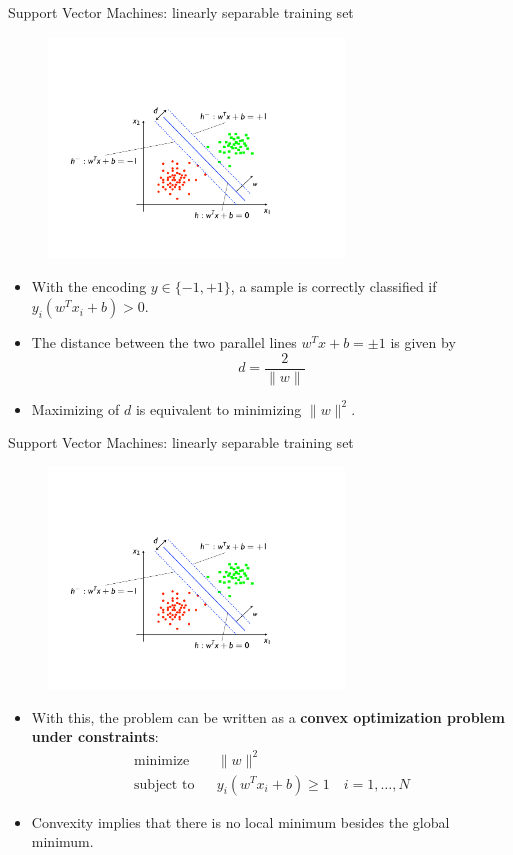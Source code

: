 \documentclass[xcolor=pdftex,dvipsnames,table]{beamer}
\begin{document}
\begin{frame}{Support Vector Machines: linearly separable training set}
	\begin{figure}[htb]
		\includegraphics[width=0.7\textwidth]{../graphics/SVM2.pdf}
	\end{figure}
	\begin{itemize}
		\item With the encoding $y\in\{-1,+1\}$, a sample is correctly classified if $y_i(w^Tx_i + b) > 0$. 
		\item The distance between the two parallel lines $w^Tx + b = \pm 1$ is given by
		\begin{equation}
			d = \frac{2}{\|w\|}
		\end{equation}
		\item Maximizing of $d$ is equivalent to minimizing $\|w\|^2$.
	\end{itemize}
\end{frame}

\begin{frame}{Support Vector Machines: linearly separable training set}
	\begin{figure}[htb]
		\includegraphics[width=0.7\textwidth]{../graphics/SVM2.pdf}
	\end{figure}
	\begin{itemize}
		\item With this, the problem can be written as a {\bf convex optimization problem under constraints}: 
		\begin{eqnarray*}
			\mbox{minimize} & & \|w\|^2 \\
			\mbox{subject to} & & y_i(w^Tx_i + b) \geq 1 \quad i = 1, \ldots, N
		\end{eqnarray*}
		\item Convexity implies that there is no local minimum besides the global minimum. 
	\end{itemize}
\end{frame}
\end{document}

